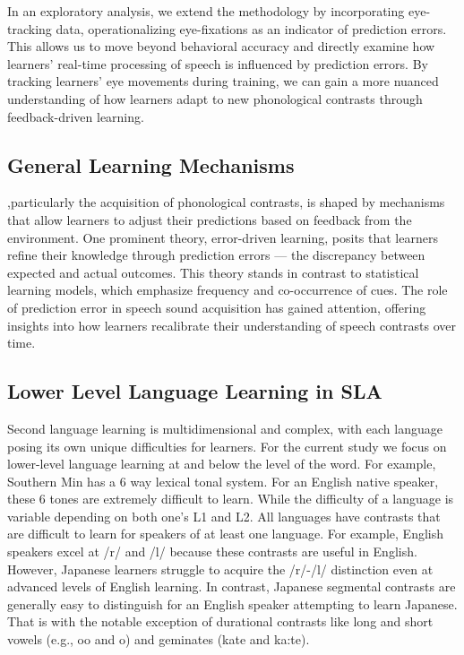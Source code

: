 In an exploratory analysis, we extend the methodology by incorporating eye-tracking data, operationalizing eye-fixations as an indicator of prediction errors. This allows us to move beyond behavioral accuracy and directly examine how learners’ real-time processing of speech is influenced by prediction errors. By tracking learners’ eye movements during training, we can gain a more nuanced understanding of how learners adapt to new phonological contrasts through feedback-driven learning.












\subsection{General Learning Mechanisms}

,particularly the acquisition of phonological contrasts, is shaped by mechanisms that allow learners to adjust their predictions based on feedback from the environment. One prominent theory, error-driven learning, posits that learners refine their knowledge through prediction errors — the discrepancy between expected and actual outcomes. This theory stands in contrast to statistical learning models, which emphasize frequency and co-occurrence of cues. The role of prediction error in speech sound acquisition has gained attention, offering insights into how learners recalibrate their understanding of speech contrasts over time.


\subsection{Lower Level Language Learning in SLA}

Second language learning is multidimensional and complex, with each language posing its own unique difficulties for learners. For the current study we focus on lower-level language learning at and below the level of the word. For example, Southern Min has a 6 way lexical tonal system. For an English native speaker, these 6 tones are extremely difficult to learn. While the difficulty of a language is variable depending on both one's L1 and L2. All languages have contrasts that are difficult to learn for speakers of at least one language. For example, English speakers excel at /r/ and /l/ because these contrasts are useful in English. However, Japanese learners struggle to acquire the /r/-/l/ distinction even at advanced levels of English learning. In contrast, Japanese segmental contrasts are generally easy to distinguish for an English speaker attempting to learn Japanese. That is with the notable exception of durational contrasts like long and short vowels (e.g., oo and o) and geminates (kate and ka:te). 

